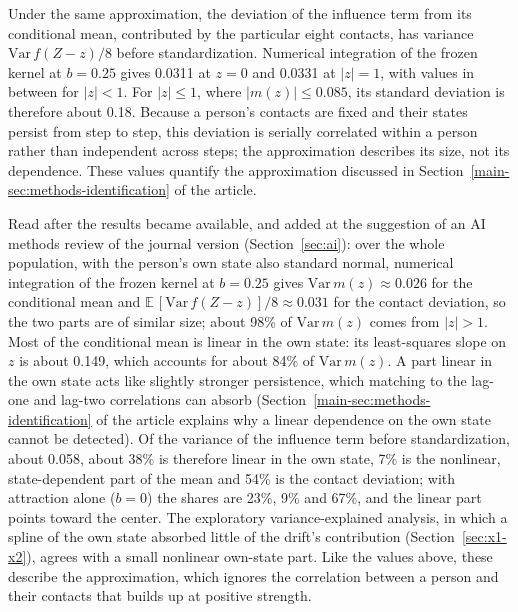 Under the same approximation, the deviation of the influence term from its conditional mean, contributed by the particular eight contacts, has variance $\mathrm{Var}\,f(Z-z)/8$ before standardization. Numerical integration of the frozen kernel at $b=0.25$ gives 0.0311 at $z=0$ and 0.0331 at $|z|=1$, with values in between for $|z|<1$. For $|z|\le1$, where $|m(z)|\le0.085$, its standard deviation is therefore about 0.18. Because a person's contacts are fixed and their states persist from step to step, this deviation is serially correlated within a person rather than independent across steps; the approximation describes its size, not its dependence. These values quantify the approximation discussed in Section~\ref{main-sec:methods-identification} of the article.

Read after the results became available, and added at the suggestion of an AI methods review of the journal version (Section~\ref{sec:ai}): over the whole population, with the person's own state also standard normal, numerical integration of the frozen kernel at $b=0.25$ gives $\mathrm{Var}\,m(z)\approx0.026$ for the conditional mean and $\mathbb E\,[\mathrm{Var}\,f(Z-z)]/8\approx0.031$ for the contact deviation, so the two parts are of similar size; about 98\% of $\mathrm{Var}\,m(z)$ comes from $|z|>1$. Most of the conditional mean is linear in the own state: its least-squares slope on $z$ is about 0.149, which accounts for about 84\% of $\mathrm{Var}\,m(z)$. A part linear in the own state acts like slightly stronger persistence, which matching to the lag-one and lag-two correlations can absorb (Section~\ref{main-sec:methods-identification} of the article explains why a linear dependence on the own state cannot be detected). Of the variance of the influence term before standardization, about 0.058, about 38\% is therefore linear in the own state, 7\% is the nonlinear, state-dependent part of the mean and 54\% is the contact deviation; with attraction alone ($b=0$) the shares are 23\%, 9\% and 67\%, and the linear part points toward the center. The exploratory variance-explained analysis, in which a spline of the own state absorbed little of the drift's contribution (Section~\ref{sec:x1-x2}), agrees with a small nonlinear own-state part. Like the values above, these describe the approximation, which ignores the correlation between a person and their contacts that builds up at positive strength.

